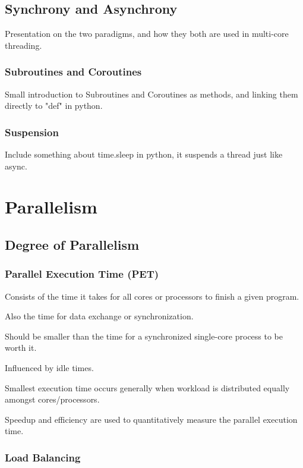 \documentclass{article}
\begin{document}
\subsection{Synchrony and Asynchrony}

Presentation on the two paradigms, and how they both are used in multi-core threading.

\subsubsection{Subroutines and Coroutines}

Small introduction to Subroutines and Coroutines as methods, and linking them directly to "def" in python.

\subsubsection{Suspension}

Include something about time.sleep in python, it suspends a thread just like async.

\section{Parallelism}
\subsection{Degree of Parallelism}
\subsubsection{Parallel Execution Time (PET)}

Consists of the time it takes for all cores or processors to finish a given program.

Also the time for data exchange or synchronization.

Should be smaller than the time for a synchronized single-core process to be worth it.

Influenced by idle times.

Smallest execution time occurs generally when workload is distributed equally amongst cores/processors.

Speedup and efficiency are used to quantitatively measure the parallel execution time.

\subsubsection{Load Balancing}
\end{document}
